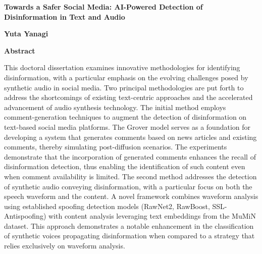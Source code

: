 \cleardoublepage
{} 
\thispagestyle{plain}
\begin{center}
    \Large
    \textbf{Towards a Safer Social Media: AI-Powered Detection of Disinformation in Text and Audio}
        
    \vspace{0.4cm}
    \textbf{Yuta Yanagi}
       
    \vspace{0.9cm}
    \textbf{Abstract}
   
\end{center}
This doctoral dissertation examines innovative methodologies for identifying disinformation, 
with a particular emphasis on the evolving challenges posed by synthetic audio in social media. 
Two principal methodologies are put forth to address the shortcomings of existing text-centric approaches and the accelerated advancement of audio synthesis technology.
The initial method employs comment-generation techniques to augment the detection of disinformation on text-based social media platforms. 
The Grover model serves as a foundation for developing a system that generates comments based on news articles and existing comments, thereby simulating post-diffusion scenarios. 
The experiments demonstrate that the incorporation of generated comments enhances the recall of disinformation detection, 
thus enabling the identification of such content even when comment availability is limited.
The second method addresses the detection of synthetic audio conveying disinformation, 
with a particular focus on both the speech waveform and the content. 
A novel framework combines waveform analysis using established spoofing detection models (RawNet2, RawBoost, SSL-Antispoofing)
with content analysis leveraging text embeddings from the MuMiN dataset. 
This approach demonstrates a notable enhancement in the classification of synthetic voices propagating disinformation when compared to a strategy that relies exclusively on waveform analysis.


